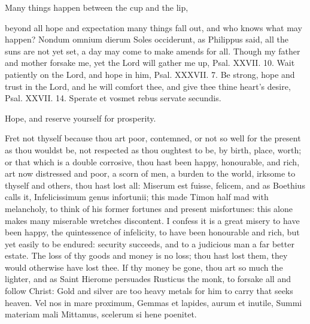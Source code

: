 {Many things happen between the cup and the lip,

beyond all hope and expectation many things fall out, and who knows
what may happen? Nondum omnium dierum Soles occiderunt, as Philippus
said, all the suns are not yet set, a day may come to make amends for
all. Though my father and mother forsake me, yet the Lord will gather
me up, Psal. XXVII. 10. Wait patiently on the Lord, and hope in him,
Psal. XXXVII. 7. Be strong, hope and trust in the Lord, and he will
comfort thee, and give thee thine heart's desire, Psal. XXVII. 14.
Sperate et vosmet rebus servate secundis.

Hope, and reserve yourself for prosperity.

Fret not thyself because thou art poor, contemned, or not so well for
the present as thou wouldst be, not respected as thou oughtest to be,
by birth, place, worth; or that which is a double corrosive, thou hast
been happy, honourable, and rich, art now distressed and poor, a scorn
of men, a burden to the world, irksome to thyself and others, thou hast
lost all: Miserum est fuisse, felicem, and as Boethius calls it,
Infelicissimum genus infortunii; this made Timon half mad with
melancholy, to think of his former fortunes and present misfortunes:
this alone makes many miserable wretches discontent. I confess it is a
great misery to have been happy, the quintessence of infelicity, to
have been honourable and rich, but yet easily to be endured:
security succeeds, and to a judicious man a far better estate.
The loss of thy goods and money is no loss;  thou hast lost them,
they would otherwise have lost thee. If thy money be gone, thou
art so much the lighter, and as Saint Hierome persuades Rusticus the
monk, to forsake all and follow Christ: Gold and silver are too heavy
metals for him to carry that seeks heaven.
Vel nos in mare proximum,
Gemmas et lapides, aurum et inutile,
Summi materiam mali
Mittamus, scelerum si hene poenitet.

}
